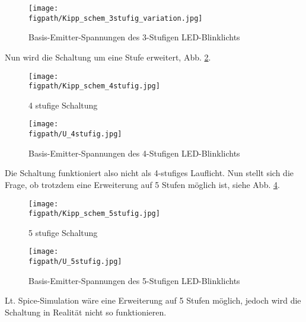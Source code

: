 \begin{figure}[H]
	\centering \small
	\texttt{[image: \\figpath/Kipp\_schem\_3stufig\_variation.jpg]}
	\caption{Basis-Emitter-Spannungen des 3-Stufigen LED-Blinklichts}
	\label{fig_Kap3_111:Spannungen}
\end{figure}

Nun wird die Schaltung um eine Stufe erweitert, Abb. \ref{fig_Kap3_12:4stufig}.

\begin{figure}[H]
    \centering
    \texttt{[image: \\figpath/Kipp\_schem\_4stufig.jpg]}
    \caption{4 stufige Schaltung}
    \label{fig_Kap3_12:4stufig}
\end{figure}

\begin{figure}[H]
	\centering \small
	\texttt{[image: \\figpath/U\_4stufig.jpg]}
	\caption{Basis-Emitter-Spannungen des 4-Stufigen LED-Blinklichts}
	\label{fig_Kap3_13:Spannungen}
\end{figure}

Die Schaltung funktioniert also nicht als 4-stufiges Lauflicht. Nun stellt sich die Frage, ob trotzdem eine Erweiterung auf 5 Stufen möglich ist, siehe Abb. \ref{fig_Kap3_14:5stufig}.

\begin{figure}[H]
    \centering
    \texttt{[image: \\figpath/Kipp\_schem\_5stufig.jpg]}
    \caption{5 stufige Schaltung}
    \label{fig_Kap3_14:5stufig}
\end{figure}

\begin{figure}[H]
	\centering \small
	\texttt{[image: \\figpath/U\_5stufig.jpg]}
	\caption{Basis-Emitter-Spannungen des 5-Stufigen LED-Blinklichts}
	\label{fig_Kap3_15:Spannungen}
\end{figure}

Lt. Spice-Simulation wäre eine Erweiterung auf 5 Stufen möglich, jedoch wird die Schaltung in Realität nicht so funktionieren.